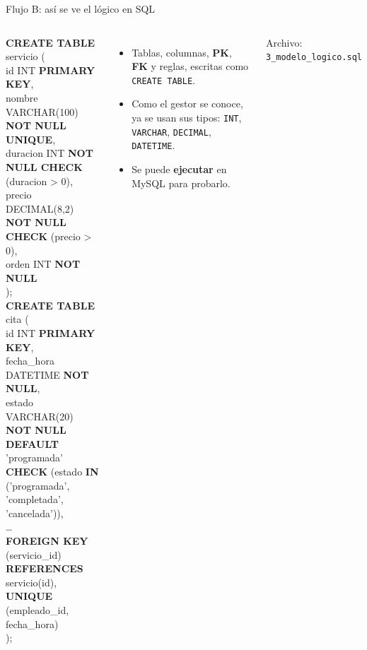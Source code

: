 \documentclass[aspectratio=169,10pt,c]{beamer}
\newcommand{\kw}[1]{\textcolor{utpRojo}{\textbf{#1}}}
\newenvironment{sqlcode}[1][.86\textwidth]
  {\begin{center}\begin{lrbox}{\sqlbuf}\begin{minipage}{#1}\ttfamily\footnotesize\vspace{6pt}\raggedright}
  {\vspace{6pt}\end{minipage}\end{lrbox}\colorbox{utpGrisClaro}{\usebox{\sqlbuf}}\end{center}}
\newcommand{\ind}{\hspace*{1.6em}}
\begin{document}
\begin{frame}{Flujo B: así se ve el lógico en SQL}
\begin{columns}[c,onlytextwidth]
\begin{sqlcode}[\dimexpr\textwidth-2\fboxsep\relax]
\scriptsize
\kw{CREATE TABLE} servicio (\\
\ind id INT \kw{PRIMARY KEY},\\
\ind nombre VARCHAR(100) \kw{NOT NULL UNIQUE},\\
\ind duracion INT \kw{NOT NULL CHECK} (duracion > 0),\\
\ind precio DECIMAL(8,2) \kw{NOT NULL CHECK} (precio > 0),\\
\ind orden INT \kw{NOT NULL}\\
);\\[4pt]
\kw{CREATE TABLE} cita (\\
\ind id INT \kw{PRIMARY KEY},\\
\ind fecha\_hora DATETIME \kw{NOT NULL},\\
\ind estado VARCHAR(20) \kw{NOT NULL DEFAULT} 'programada'\\
\ind\ind \kw{CHECK} (estado \kw{IN} ('programada', 'completada',\\
\ind\ind \hspace*{4.6em}'cancelada')),\\
\ind \ldots\\
\ind \kw{FOREIGN KEY} (servicio\_id) \kw{REFERENCES} servicio(id),\\
\ind \kw{UNIQUE} (empleado\_id, fecha\_hora)\\
);
\end{sqlcode}
\small
\begin{itemize}\setlength\itemsep{6pt}
  \item Tablas, columnas, \textbf{PK}, \textbf{FK} y reglas, escritas como \texttt{CREATE TABLE}.
  \item Como el gestor se conoce, ya se usan sus tipos: \texttt{INT}, \texttt{VARCHAR}, \texttt{DECIMAL}, \texttt{DATETIME}.
  \item Se puede \textbf{ejecutar} en MySQL para probarlo.
\end{itemize}
\vspace{0.15cm}
\footnotesize\color{utpGris} Archivo: \texttt{3\_modelo\_logico.sql}
\end{columns}
\end{frame}
\end{document}
